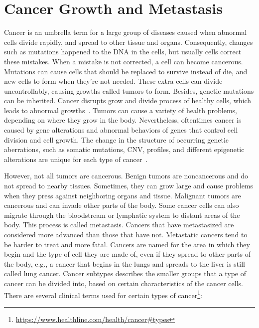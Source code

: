 \section{Cancer Growth and Metastasis}
\label{cancer_growth}
Cancer is an umbrella term for a large group of diseases caused when abnormal cells divide rapidly, and spread to other tissue and organs. Consequently, changes such as mutations happened to the DNA in the cells, but usually cells correct these mistakes. When a mistake is not corrected, a cell can become cancerous. Mutations can cause cells that should be replaced to survive instead of die, and new cells to form when they're not needed. These extra cells can divide uncontrollably, causing growths called tumors to form. Besides, genetic mutations can be inherited. Cancer disrupts grow and divide process of healthy cells, which leads to abnormal growths~\cite{pancan}. 
Tumors can cause a variety of health problems, depending on where they grow in the body. Nevertheless, oftentimes cancer is caused by gene alterations and abnormal behaviors of genes that control cell division and cell growth. The change in the structure of occurring genetic aberrations, such as somatic mutations, CNV, profiles, and different epigenetic alterations are unique for each type of cancer~\cite{82Tomczak,19Cruz}. 

\hspace*{3.5mm} However, not all tumors are cancerous. Benign tumors are noncancerous and do not spread to nearby tissues. Sometimes, they can grow large and cause problems when they press against neighboring organs and tissue. Malignant tumors are cancerous and can invade other parts of the body. Some cancer cells can also migrate through the bloodstream or lymphatic system to distant areas of the body. This process is called metastasis. Cancers that have metastasized are considered more advanced than those that have not. Metastatic cancers tend to be harder to treat and more fatal. Cancers are named for the area in which they begin and the type of cell they are made of, even if they spread to other parts of the body, e.g., a cancer that begins in the lungs and spreads to the liver is still called lung cancer. Cancer subtypes describes the smaller groups that a type of cancer can be divided into, based on certain characteristics of the cancer cells. There are several clinical terms used for certain types of cancer\footnote{\url{https://www.healthline.com/health/cancer\#types}}:

